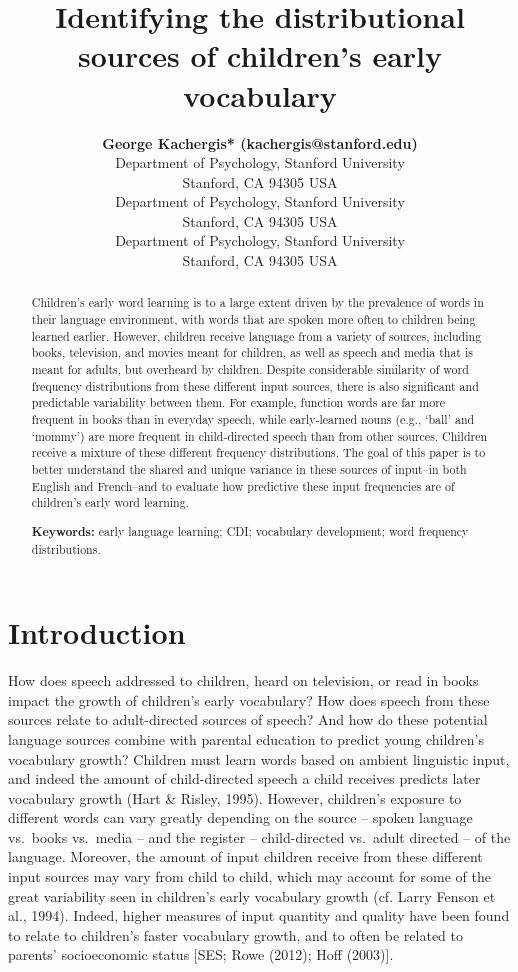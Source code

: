 \documentclass[10pt, letterpaper]{article}
\title{Identifying the distributional sources of children's early
vocabulary}
\author{{\large \bf George Kachergis* (kachergis@stanford.edu)} \\ Department of Psychology, Stanford University \\ Stanford, CA 94305 USA \AND {\large \bf Georgia Loukatou* (@stanford.edu)} \\ Department of Psychology, Stanford University \\ Stanford, CA 94305 USA \AND {\large \bf Michael C. Frank (mcfrank@stanford.edu)} \\ Department of Psychology, Stanford University \\ Stanford, CA 94305 USA}
\begin{document}
\maketitle

\begin{abstract}
Children's early word learning is to a large extent driven by the
prevalence of words in their language environment, with words that are
spoken more often to children being learned earlier. However, children
receive language from a variety of sources, including books, television,
and movies meant for children, as well as speech and media that is meant
for adults, but overheard by children. Despite considerable similarity
of word frequency distributions from these different input sources,
there is also significant and predictable variability between them. For
example, function words are far more frequent in books than in everyday
speech, while early-learned nouns (e.g., `ball' and `mommy') are more
frequent in child-directed speech than from other sources. Children
receive a mixture of these different frequency distributions. The goal
of this paper is to better understand the shared and unique variance in
these sources of input--in both English and French--and to evaluate how
predictive these input frequencies are of children's early word
learning.

\textbf{Keywords:}
early language learning; CDI; vocabulary development; word frequency
distributions.
\end{abstract}

\hypertarget{introduction}{%
\section{Introduction}\label{introduction}}

How does speech addressed to children, heard on television, or read in
books impact the growth of children's early vocabulary? How does speech
from these sources relate to adult-directed sources of speech? And how
do these potential language sources combine with parental education to
predict young children's vocabulary growth? Children must learn words
based on ambient linguistic input, and indeed the amount of
child-directed speech a child receives predicts later vocabulary growth
(Hart \& Risley, 1995). However, children's exposure to different words
can vary greatly depending on the source -- spoken language vs.~books
vs.~media -- and the register -- child-directed vs.~adult directed -- of
the language. Moreover, the amount of input children receive from these
different input sources may vary from child to child, which may account
for some of the great variability seen in children's early vocabulary
growth (cf. Larry Fenson et al., 1994). Indeed, higher measures of input
quantity and quality have been found to relate to children's faster
vocabulary growth, and to often be related to parents' socioeconomic
status {[}SES; Rowe (2012); Hoff (2003){]}.
\end{document}
